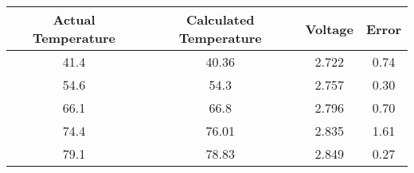 \begin{table}[h]
  \centering
  \label{tab:result-error}
  \begin{tabular}{|c|c|c|c|}
    \hline
    \textbf{Actual Temperature} & \textbf{Calculated Temperature} & \textbf{Voltage} & \textbf{Error} \\ \hline
    41.4 & 40.36 & 2.722 & 0.74 \\ \hline
    54.6 & 54.3  & 2.757 & 0.30 \\ \hline
    66.1 & 66.8  & 2.796 & 0.70 \\ \hline
    74.4 & 76.01 & 2.835 & 1.61 \\ \hline
    79.1 & 78.83 & 2.849 & 0.27 \\ \hline
  \end{tabular}
\end{table}
